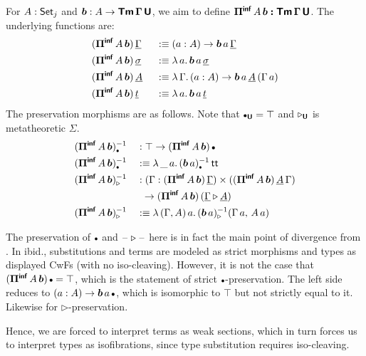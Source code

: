\documentclass[sigplan,review,anonymous]{acmart}\settopmatter{printfolios=true,printccs=false,printacmref=false}
\newcommand{\ext}{\triangleright}
\newcommand{\emptycon}{\scaleobj{.75}\bullet}
\newcommand{\Piinf}{\Pi^{\mathsf{inf}}}
\newcommand{\bTm}{\boldsymbol{\Tm}}
\newcommand{\bGamma}{\boldsymbol{\Gamma}}
\newcommand{\bb}{\boldsymbol{b}}
\newcommand{\bU}{\boldsymbol{\U}}
\newcommand{\bPiinf}{\boldsymbol{\Piinf}}
\newcommand{\ul}[1]{\underline{#1}}
\newcommand{\ulGamma}{\ul{\Gamma}}
\newcommand{\ulsigma}{\ul{\sigma}}
\newcommand{\ult}{\ul{t}}
\newcommand{\ulA}{\ul{A}}
\begin{document}
For $A : \mathsf{Set}_j$ and $\bb : A \ra \bTm\,\bGamma\,\bU$, we aim to define
$\bPiinf\,A\,\bb \boldsymbol{:} \bTm\,\bGamma\,\bU$. The underlying functions
are:
\begin{alignat*}{3}
  & (\bPiinf\,A\,\bb)\,\ulGamma    &&:\equiv (a : A)\ra \bb\,a\,\ulGamma\\
  & (\bPiinf\,A\,\bb)\,\ulsigma    &&:\equiv \lambda\,a.\, \bb\,a\,\ulsigma\\
  & (\bPiinf\,A\,\bb)\,\ulA\       &&:\equiv \lambda\,\Gamma.\,(a : A)\ra \bb\,a\,\ulA\,(\Gamma\, a)\\
  & (\bPiinf\,A\,\bb)\,\ult        &&:\equiv \lambda\,a.\, \bb\,a\,\ult
\end{alignat*}
The preservation morphisms are as follows. Note that $\emptycon_{\bU} = \top$ and $\ext_{\bU}$ is
metatheoretic $\Sigma$.
\begin{alignat*}{3}
  &(\bPiinf\,A\,\bb)_{\emptycon}^{-1} && : \top\ra (\bPiinf\,A\,\bb)\,\emptycon\\
  &(\bPiinf\,A\,\bb)_{\emptycon}^{-1} && :\equiv \lambda\,\_\,a.\,(\bb\,a)_{\emptycon}^{-1}\,\tt\\
  &(\bPiinf\,A\,\bb)_{\ext}^{-1} && : (\Gamma : (\bPiinf\,A\,\bb)\,\ulGamma)\times((\bPiinf\,A\,\bb)\,\ulA\,\Gamma)\\
  & && \hspace{0.5em}\ra (\bPiinf\,A\,\bb)\,(\ulGamma \ext \ulA)\\
  & (\bPiinf\,A\,\bb)_{\ext}^{-1} && :\equiv \lambda\,(\Gamma,A)\,a.\,(\bb\,a)_{\ext}^{-1}(\Gamma\,a,\,A\,a)
\end{alignat*}

The preservation of $\emptycon$ and $\blank\ext\blank$ here is in fact the main
point of divergence from \cite{kaposi2019constructing}. In ibid., substitutions
and terms are modeled as strict morphisms and types as displayed CwFs (with no
iso-cleaving). However, it is not the case that $(\bPiinf\,A\,\bb)\,\emptycon =
\top$, which is the statement of strict $\emptycon$-preservation. The left side
reduces to $(a : A)\ra \bb\,a\,\emptycon$, which is isomorphic to $\top$ but not
strictly equal to it. Likewise for $\ext$-preservation.

Hence, we are forced to
interpret terms as weak sections, which in turn forces us to interpret
types as isofibrations, since type substitution requires iso-cleaving.
\end{document}
